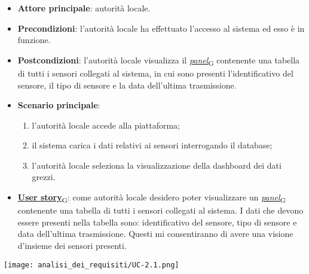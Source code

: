 \begin{itemize}
	\item \textbf{Attore principale}: autorità locale.
	\item \textbf{Precondizioni}: l'autorità locale ha effettuato l'accesso al sistema ed esso è in funzione.
	\item \textbf{Postcondizioni}: l'autorità locale visualizza il \href{https://7last.github.io/docs/pb/documentazione-interna/glossario\#panel}{\textit{panel}\textsubscript{G}} contenente una tabella di tutti i sensori collegati al sistema,
	      in cui sono presenti l'identificativo del sensore, il tipo di sensore e la data dell'ultima trasmissione.
	\item \textbf{Scenario principale}:
	      \begin{enumerate}
		      \item l'autorità locale accede alla piattaforma;
		      \item il sistema carica i dati relativi ai sensori interrogando il database;
		      \item l'autorità locale seleziona la visualizzazione della dashboard dei dati grezzi.
	      \end{enumerate}
	\item \href{https://7last.github.io/docs/pb/documentazione-interna/glossario\#user-story}{\textbf{User story}\textsubscript{G}}: come autorità locale desidero poter visualizzare un \href{https://7last.github.io/docs/pb/documentazione-interna/glossario\#panel}{\textit{panel}\textsubscript{G}} contenente una tabella di tutti i sensori collegati al sistema. I dati che devono essere presenti nella tabella sono: identificativo del sensore, tipo di sensore e data dell'ultima trasmissione. Questi mi consentiranno di avere una visione d'insieme dei sensori presenti.
\end{itemize}
\begin{center}
	\texttt{[image: analisi\_dei\_requisiti/UC-2.1.png]}
\end{center}

